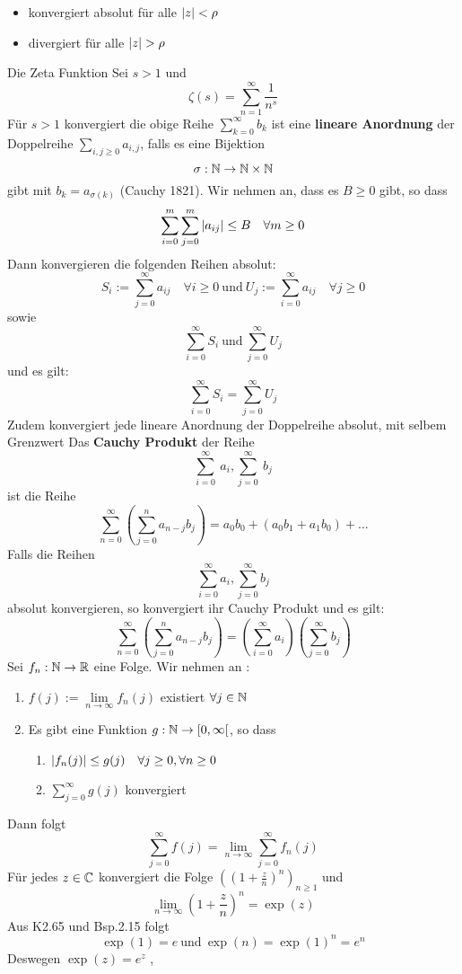 \begin{itemize}
    \item konvergiert absolut für alle $\left\lvert z \right\rvert < \rho$ 
    \item divergiert für alle $\left\lvert z \right\rvert > \rho$
\end{itemize}
\Def[] Die Zeta Funktion
Sei \( s > 1\) und
\[ \zeta(s) = \sum_{n=1}^{\infty} \frac{1}{n^s}\]
Für \(s > 1\) konvergiert die obige Reihe
\Def[2.58] \(\sum_{k=0}^{\infty} b_k \) ist eine \textbf{lineare Anordnung} der Doppelreihe \(\sum_{i,j \geq 0} a_{i,j}\), falls es eine Bijektion \[\sigma : \mathbb{N} \rightarrow \mathbb{N} \times \mathbb{N} \] gibt mit \(b_k = a_{\sigma(k)}\) \newline
\Satz[2.59] (Cauchy 1821). Wir nehmen an, dass es \(B \geq 0\) gibt, so dass
\[\sum_{i=0}^{m}\sum_{j=0}^{m}\left\lvert a_{ij} \right\rvert \leq B \quad \forall m \geq 0\]
Dann konvergieren die folgenden Reihen absolut:
\[S_i := \sum_{j=0}^\infty a_{ij} \quad \forall i \geq 0 \  \text{und} \  U_j := \sum_{i=0}^{\infty}a_{ij} \quad \forall j \geq 0\]
sowie
\[\sum_{i=0}^\infty S_i \ \text{und} \ \sum_{j=0}^\infty U_j\]
und es gilt:
\[\sum_{i=0}^\infty S_i  =  \sum_{j=0}^\infty U_j\]
Zudem konvergiert jede lineare Anordnung der Doppelreihe absolut, mit selbem Grenzwert \newline
\Def[2.60] Das \textbf{Cauchy Produkt} der Reihe
\[\sum_{i=0}^\infty\ a_i, \sum_{j=0}^\infty\ b_j\]
ist die Reihe
\[\sum_{n=0}^\infty ( \sum_{j=0}^n a_{n-j}b_j )= a_0b_0 + (a_0b_1 + a_1b_0) + \dots \] \newline
\Satz[2.62] Falls die Reihen
\[\sum_{i=0}^\infty a_i , \sum_{j=0}^\infty b_j\]
absolut konvergieren, so konvergiert ihr Cauchy Produkt und es gilt:
\[\sum_{n=0}^{\infty} (\sum_{j=0}^n a_{n-j}b_j) = (\sum_{i=0}^{\infty} a_i) (\sum_{j=0}^{\infty} b_j)\]
\Satz[2.64]  Sei \( f_n : \mathbb{N} \rightarrow \mathbb{R} \) eine Folge. Wir nehmen an :
\begin{enumerate}
    \item [1] \(f(j) := \lim\limits_{n \rightarrow \infty} f_n(j)\) existiert \(\forall j \in \mathbb{N}\)
    \item [2] Es gibt eine Funktion \(g: \mathbb{N} \rightarrow [0, \infty[\), so dass
    \begin {enumerate}
    \item [2.1] \(\left\lvert f_n(j) \right\rvert \leq g(j) \quad \forall j \geq 0, \forall n \geq 0\)
    \item [2.2] \(\sum_{j=0}^\infty g(j)\) konvergiert
    \end{enumerate}
\end{enumerate}
Dann folgt
\[\sum_{j=0}^\infty f(j) = \lim\limits_{n \rightarrow \infty} \sum_{j=0}^\infty f_n(j)\]
\Korollar[2.65] Für jedes \(z \in \mathbb{C} \) konvergiert die Folge \(((1 + \frac{z}{n})^n)_{n \geq 1}\) und
\[\lim\limits_{n \rightarrow \infty} (1 + \frac{z}{n})^n = \exp(z)\]
Aus K2.65 und Bsp.2.15 folgt
\[\exp(1) = e \ \text{und} \ \exp(n) = \exp(1)^n = e^n\]
Deswegen  \( \exp(z) = e^z\)
\sep